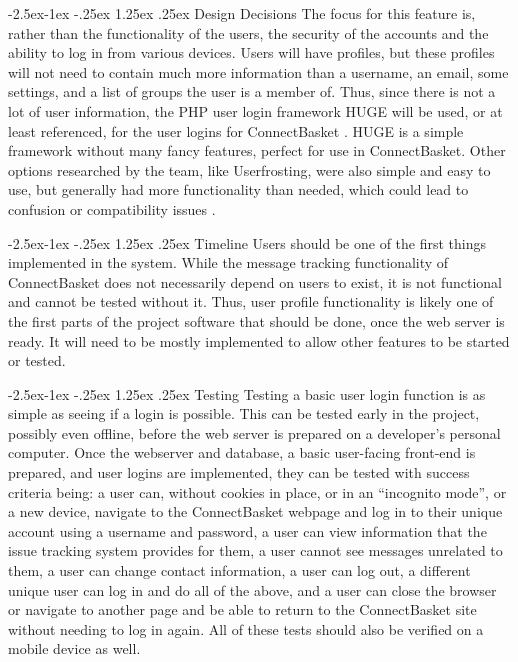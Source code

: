 \documentclass[onecolumn, draftclsnofoot,10pt, compsoc]{IEEEtran}
\makeatletter
\renewcommand\paragraph{\@startsection{paragraph}{4}{\z@}%
            {-2.5ex\@plus -1ex \@minus -.25ex}%
            {1.25ex \@plus .25ex}%
            {\normalfont\normalsize\bfseries}}
\makeatother
\begin{document}
\paragraph{Design Decisions}
The focus for this feature is, rather than the functionality of the users, the security of the accounts and the ability to log in from various devices. Users will have profiles, but these profiles will not need to contain much more information than a username, an email, some settings, and a list of groups the user is a member of. Thus, since there is not a lot of user information, the PHP user login framework HUGE will be used, or at least referenced, for the user logins for ConnectBasket \cite{huge}. HUGE is a simple framework without many fancy features, perfect for use in ConnectBasket. Other options researched by the team, like Userfrosting, were also simple and easy to use, but generally had more functionality than needed, which could lead to confusion or compatibility issues \cite{userfrosting}.

\paragraph{Timeline}
Users should be one of the first things implemented in the system. While the message tracking functionality of ConnectBasket does not necessarily depend on users to exist, it is not functional and cannot be tested without it. Thus, user profile functionality is likely one of the first parts of the project software that should be done, once the web server is ready. It will need to be mostly implemented to allow other features to be started or tested.

\paragraph{Testing}
Testing a basic user login function is as simple as seeing if a login is possible. This can be tested early in the project, possibly even offline, before the web server is prepared on a developer’s personal computer. Once the webserver and database, a basic user-facing front-end is prepared, and user logins are implemented, they can be tested with success criteria being: a user can, without cookies in place, or in an “incognito mode”, or a new device, navigate to the ConnectBasket webpage and log in to their unique account using a username and password, a user can view information that the issue tracking system provides for them, a user cannot see messages unrelated to them, a user can change contact information, a user can log out, a different unique user can log in and do all of the above, and a user can close the browser or navigate to another page and be able to return to the ConnectBasket site without needing to log in again. All of these tests should also be verified on a mobile device as well.
\end{document}
